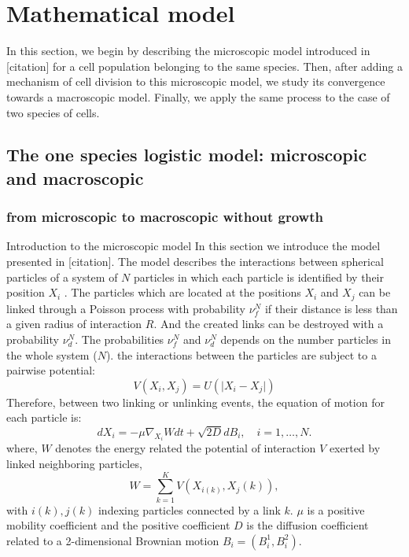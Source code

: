 \section{Mathematical model}
In this section, we begin by describing the microscopic model introduced in [citation] for a cell population belonging to the same species. Then, after adding a mechanism of cell division to this microscopic model, we  study its convergence towards a macroscopic model. Finally, we apply the same process to the case of two species of cells.
	\subsection{The one species logistic model: microscopic and macroscopic}
	\subsubsection{from microscopic to macroscopic without growth}
	\begin{paragraph}{Introduction to the microscopic model}
	In this section we introduce the model presented in [citation]. The model describes the interactions between spherical particles of a system of $N$ particles in which each particle is identified by their position $X_i$ . The  particles which are located at the positions $X_i$ and $X_j$ can be linked through a Poisson process with probability $\nu_{f}^{N}$ if their distance is less than a given radius of interaction $R$. And the created links can be destroyed with a probability $\nu_{d}^{N}$. The probabilities $\nu_{f}^{N}$ and $\nu_{d}^{N}$ depends on the number particles in the whole system ($N$).
	 the interactions between the particles are subject to a pairwise potential:
	 \begin{equation}
	 V(X_i, X_j) = U(\vert X_i - X_j \vert)
	 \end{equation}
Therefore, between two linking or unlinking events, the equation of motion for each particle is: 
	\begin{equation}
	d X_i = -\mu \nabla_{X_i} W dt + \sqrt{2D}d B_i, \quad i = 1, \ldots ,N.
	\end{equation}
where, $W$ denotes the energy related the potential of interaction $V$ exerted by linked neighboring particles,
	$$ W = \sum_{k=1}^{K} V(X_{i(k)}, X_j(k)),$$
with $i(k), j(k)$ indexing particles connected by a link $k$. $\mu$ is a positive mobility coefficient and the positive coefficient $D$ is the diffusion coefficient related to a 2-dimensional Brownian motion $B_i = (B_i^1, B_i^2)$.
	\end{paragraph}
